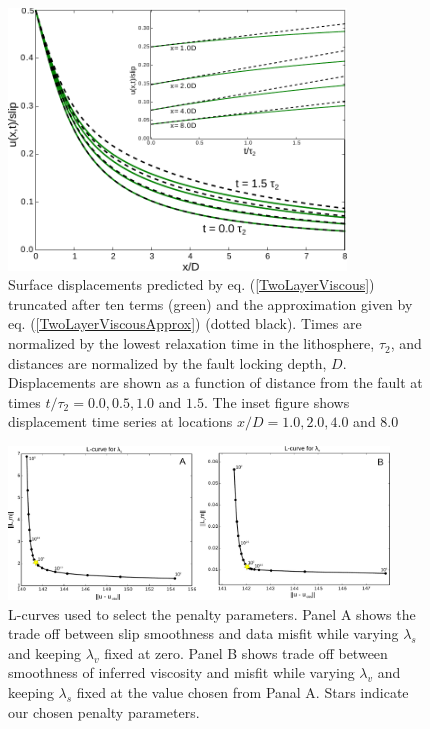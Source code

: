 \documentclass[extra]{gji}
\begin{document}
\begin{figure}[h!]\label{figure1}
  \centering
  \includegraphics[width=0.8\textwidth]{FinalFigures/Figure1.pdf}
  \caption{Surface displacements predicted by
    eq. (\ref{TwoLayerViscous}) truncated after ten terms (green) and
    the approximation given by eq. (\ref{TwoLayerViscousApprox})
    (dotted black).  Times are normalized by the lowest relaxation
    time in the lithosphere, $\tau_2$, and distances are normalized by
    the fault locking depth, $D$.  Displacements are shown as a
    function of distance from the fault at times $t/\tau_2 =
    0.0,0.5,1.0$ and $1.5$. The inset figure shows displacement time
    series at locations $x/D = 1.0, 2.0, 4.0$ and $8.0$}
  \label{Figure 1}
\end{figure}

\begin{figure}[h!]\label{figure2}
  \centering
  \includegraphics[width=0.9\textwidth]{FinalFigures/Figure6.pdf}
  \caption{L-curves used to select the penalty parameters. Panel A
    shows the trade off between slip smoothness and data misfit while
    varying $\lambda_s$ and keeping $\lambda_v$ fixed at zero.  Panel
    B shows trade off between smoothness of inferred viscosity and
    misfit while varying $\lambda_v$ and keeping $\lambda_s$ fixed at
    the value chosen from Panal A.  Stars indicate our chosen penalty
    parameters.}
  \label{Figure 2}
\end{figure}
\end{document}
